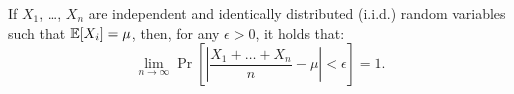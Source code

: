 \documentclass[preview, border={0pt 5pt 34pt 1pt}]{standalone} %
\begin{document}


    If \(X_1\), \dots, \(X_n\) are independent and identically distributed (i.i.d.) random variables
    such that \(\mathbb{E}[X_i] = \mu\), then, for any \(\epsilon > 0\), it holds that:
    \[
        \lim_{n \rightarrow \infty} \Pr\left[ \left|\frac{X_1 + \dots + X_n}{n} - \mu\right|< \epsilon \right] = 1.
    \]
\end{document}
